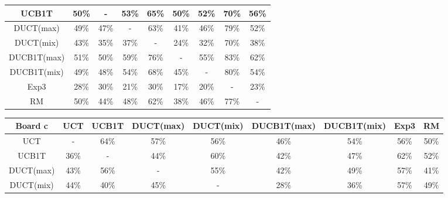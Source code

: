 \documentclass{article}
\begin{document}
\begin{table}[t]
\begin{tabular}{|c||c|c|c|c|c|c|c|c|}
 UCB1T & 50\% &    - & 53\% & 65\% & 50\% & 52\% & 70\% & 56\% \\ \hline 
   DUCT(max) & 49\% & 47\% &    - & 63\% & 41\% & 46\% & 79\% & 52\% \\ \hline 
   DUCT(mix) & 43\% & 35\% & 37\% &    - & 24\% & 32\% & 70\% & 38\% \\ \hline 
 DUCB1T(max) & 51\% & 50\% & 59\% & 76\% &    - & 55\% & 83\% & 62\% \\ \hline 
 DUCB1T(mix) & 49\% & 48\% & 54\% & 68\% & 45\% &    - & 80\% & 54\% \\ \hline 
      Exp3 & 28\% & 30\% & 21\% & 30\% & 17\% & 20\% &    - & 23\% \\ \hline 
        RM & 50\% & 44\% & 48\% & 62\% & 38\% & 46\% & 77\% &    - \\ \hline 
\end{tabular}
\begin{tabular}{|c||c|c|c|c|c|c|c|c|}
									\hline
  Board c 		& UCT 	& UCB1T		& DUCT(max)	& DUCT(mix)	& DUCB1T(max)	& DUCB1T(mix)	& Exp3	& RM				\\ 	\hline\hline
   UCT &    - & 64\% & 57\% & 56\% & 46\% & 54\% & 56\% & 50\% \\ \hline 
 UCB1T & 36\% &    - & 44\% & 60\% & 42\% & 47\% & 62\% & 52\% \\ \hline 
   DUCT(max) & 43\% & 56\% &    - & 55\% & 42\% & 49\% & 57\% & 41\% \\ \hline 
   DUCT(mix) & 44\% & 40\% & 45\% &    - & 28\% & 36\% & 57\% & 49\% \\ \hline 

\end{tabular}
\end{table}
\end{document}

